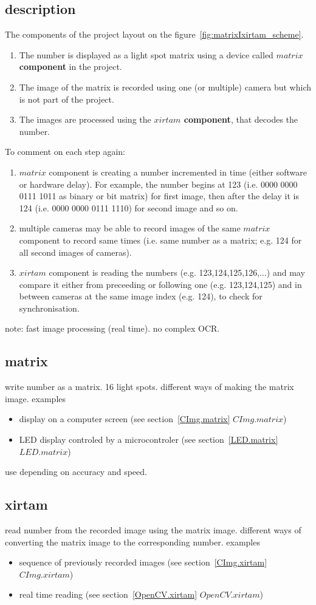 \documentclass[10pt,a4paper]{report}
\begin{document}
\subsection{description}
The components of the project layout on the figure~\ref{fig:matrixIxirtam_scheme}.
\begin{enumerate}
\item The number is displayed as a light spot matrix using a device called \textbf{$matrix$ component} in the project.
\item The image of the matrix is recorded using one (or multiple) camera but which is not part of the project.
\item The images are processed using the \textbf{$xirtam$ component}, that decodes the number.
\end{enumerate}
To comment on each step again:
\begin{enumerate}
\item $matrix$ component is creating a number incremented in time (either software or hardware delay). For example, the number begins at 123 (i.e. 0000 0000 0111 1011 as binary or bit matrix) for first image, then after the delay it is 124 (i.e. 0000 0000 0111 1110) for second image and so on.
\item multiple cameras may be able to record images of the same $matrix$ component to record same times (i.e. same number as a matrix; e.g. 124 for all second images of cameras).
\item $xirtam$ component is reading the numbers (e.g. 123,124,125,126,...) and may compare it either from preceeding or following one (e.g. 123,124,125) and in between cameras at the same image index (e.g. 124), to check for synchronisation.
\end{enumerate}
note: 
fast image processing (real time).
no complex OCR.
\subsection{matrix}
write number as a matrix. 16 light spots.
different ways of making the matrix image.
examples
\begin{itemize}
\item display on a computer screen (see section~\ref{CImg.matrix} $CImg.matrix$)
\item LED display controled by a microcontroler (see section~\ref{LED.matrix} $LED.matrix$)
\end{itemize}
use depending on accuracy and speed.
\subsection{xirtam}
read number from the recorded image using the matrix image.
different ways of converting the matrix image to the corresponding number.
examples
\begin{itemize}
\item sequence of previously recorded images (see section~\ref{CImg.xirtam} $CImg.xirtam$)
\item real time reading (see section~\ref{OpenCV.xirtam} $OpenCV.xirtam$)
\end{itemize}
\end{document}
